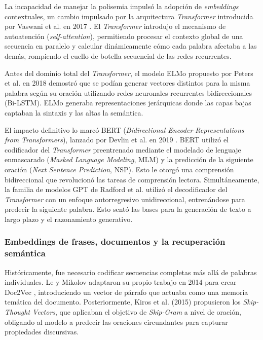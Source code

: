 La incapacidad de manejar la polisemia impulsó la adopción de \textit{embeddings} contextuales, un cambio impulsado por la arquitectura \textit{Transformer} introducida por Vaswani et al. en 2017 \cite{vaswani_attention_2017}. El \textit{Transformer} introdujo el mecanismo de autoatención (\textit{self-attention}), permitiendo procesar el contexto global de una secuencia en paralelo y calcular dinámicamente cómo cada palabra afectaba a las demás, rompiendo el cuello de botella secuencial de las redes recurrentes.

Antes del dominio total del \textit{Transformer}, el modelo ELMo propuesto por Peters et al. en 2018 \cite{peters_deep_2018} demostró que se podían generar vectores distintos para la misma palabra según su oración utilizando redes neuronales recurrentes bidireccionales (Bi-LSTM). ELMo generaba representaciones jerárquicas donde las capas bajas captaban la sintaxis y las altas la semántica.

El impacto definitivo lo marcó BERT (\textit{Bidirectional Encoder Representations from Transformers}), lanzado por Devlin et al. en 2019 \cite{devlin_bert_2019}. BERT utilizó el codificador del \textit{Transformer} preentrenado mediante el modelado de lenguaje enmascarado (\textit{Masked Language Modeling}, MLM) y la predicción de la siguiente oración (\textit{Next Sentence Prediction}, NSP). Esto le otorgó una comprensión bidireccional que revolucionó las tareas de comprensión lectora. Simultáneamente, la familia de modelos GPT de Radford et al. \cite{radford_improving_2018} utilizó el decodificador del \textit{Transformer} con un enfoque autorregresivo unidireccional, entrenándose para predecir la siguiente palabra. Esto sentó las bases para la generación de texto a largo plazo y el razonamiento generativo.

\subsubsection{Embeddings de frases, documentos y la recuperación semántica}

Históricamente, fue necesario codificar secuencias completas más allá de palabras individuales. Le y Mikolov adaptaron su propio trabajo en 2014 para crear Doc2Vec \cite{le_distributed_2014}, introduciendo un vector de párrafo que actuaba como una memoria temática del documento. Posteriormente, Kiros et al. (2015) \cite{kiros_skip_2015} propusieron los \textit{Skip-Thought Vectors}, que aplicaban el objetivo de \textit{Skip-Gram} a nivel de oración, obligando al modelo a predecir las oraciones circundantes para capturar propiedades discursivas.

